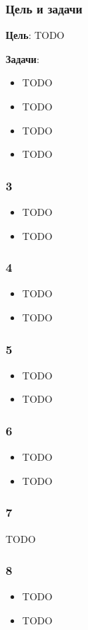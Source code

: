 \documentclass{beamer}
\begin{document}
\begin{frame}\frametitle{Цель и задачи}
\textbf{Цель}: TODO

\textbf{Задачи}:
\begin{itemize}
  \item TODO
  \item TODO
  \item TODO
  \item TODO
\end{itemize}
\end{frame}

\begin{frame}\frametitle{3}
\begin{itemize}
  \item TODO
  \item TODO
\end{itemize}
\end{frame}

\begin{frame}\frametitle{4}
\begin{itemize}
  \item TODO
  \item TODO
\end{itemize}
\end{frame}

\begin{frame}\frametitle{5}
\begin{itemize}
  \item TODO
  \item TODO
\end{itemize}
\end{frame}

\begin{frame}\frametitle{6}
\begin{itemize}
  \item TODO
  \item TODO
\end{itemize}
\end{frame}

\begin{frame}\frametitle{7}
TODO
\end{frame}

\begin{frame}\frametitle{8}
\begin{itemize}
  \item TODO
  \item TODO
\end{itemize}
\end{frame}
\end{document}
